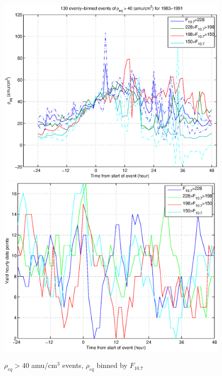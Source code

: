 \documentclass[10pt,twocolumn]{article}
\begin{document}
\begin{figure}[htp!]
\includegraphics[scale=0.45]{paperfigures/HighLowF107rhoeq-rhoeq40.eps}
\includegraphics[scale=0.45]{paperfigures/HighLowF107rhoeq-rhoeq40-valid.eps}
\caption{$\rho_{eq} > 40$ amu/cm$^3$ events, $\rho_{eq}$ binned by $F_{10.7}$}
\end{figure}
\clearpage
\end{document}
